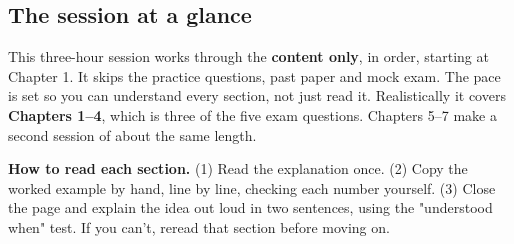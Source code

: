 \documentclass[11pt,a4paper]{article}
\begin{document}
\subsection*{The session at a glance}
This three-hour session works through the \textbf{content only}, in order, starting at Chapter 1. It skips the practice questions, past paper and mock exam. The pace is set so you can understand every section, not just read it. Realistically it covers \textbf{Chapters 1–4}, which is three of the five exam questions. Chapters 5–7 make a second session of about the same length.\par
\textbf{How to read each section.} (1) Read the explanation once. (2) Copy the worked example by hand, line by line, checking each number yourself. (3) Close the page and explain the idea out loud in two sentences, using the "understood when" test. If you can't, reread that section before moving on.\par
\end{document}
